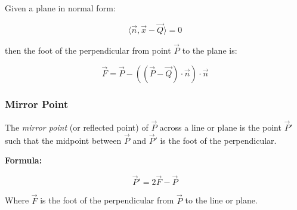 Given a plane in normal form:

\[
	\langle \vec{n}, \vec{x} - \vec{Q} \rangle = 0
\]

then the foot of the perpendicular from point \(\vec{P}\) to the plane is:

\[
	\vec{F} = \vec{P} - ((\vec{P} - \vec{Q}) \cdot \vec{n}) \cdot \vec{n}
\]

\subsubsection{Mirror Point}

The \emph{mirror point} (or reflected point) of \(\vec{P}\) across a line or plane is the point \(\vec{P}'\) such that the midpoint between \(\vec{P}\) and \(\vec{P}'\) is the foot of the perpendicular.

\textbf{Formula:}

\[
	\vec{P}' = 2\vec{F} - \vec{P}
\]

Where \(\vec{F}\) is the foot of the perpendicular from \(\vec{P}\) to the line or plane.
